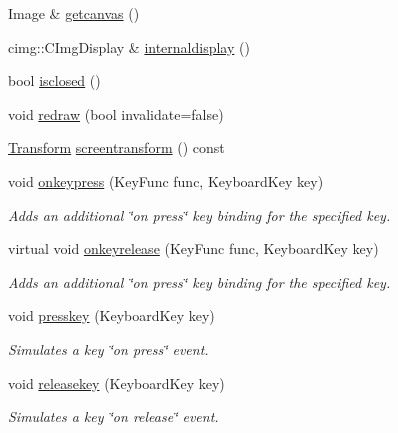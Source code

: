 \begin{DoxyCompactItemize}
\item 
Image \& \hyperlink{classcturtle_1_1InteractiveTurtleScreen_ad2156553b1af3d0ab4527d8ddbda5d61}{getcanvas} ()
\item 
cimg\+::\+C\+Img\+Display \& \hyperlink{classcturtle_1_1InteractiveTurtleScreen_a0ea57bab0cb93f0fa4629747bddbab30}{internaldisplay} ()
\item 
bool \hyperlink{classcturtle_1_1InteractiveTurtleScreen_ab1809a5a10cb3afaa330d6ba2ee5bb49}{isclosed} ()
\item 
void \hyperlink{classcturtle_1_1InteractiveTurtleScreen_ad0e307da3f48e9e1ce6660c975ca3854}{redraw} (bool invalidate=false)
\item 
\hyperlink{classcturtle_1_1Transform}{Transform} \hyperlink{classcturtle_1_1InteractiveTurtleScreen_a6c81f204488e1ebe8180504990e559dc}{screentransform} () const
\item 
void \hyperlink{classcturtle_1_1InteractiveTurtleScreen_a997c82f379c6c90e2f1d2336db8bc1fc}{onkeypress} (Key\+Func func, Keyboard\+Key key)
\begin{DoxyCompactList}\small\item\em Adds an additional \char`\"{}on press\char`\"{} key binding for the specified key. \end{DoxyCompactList}\item 
virtual void \hyperlink{classcturtle_1_1InteractiveTurtleScreen_a313943b2ae07b9a67ae0681fbadc2085}{onkeyrelease} (Key\+Func func, Keyboard\+Key key)
\begin{DoxyCompactList}\small\item\em Adds an additional \char`\"{}on press\char`\"{} key binding for the specified key. \end{DoxyCompactList}\item 
void \hyperlink{classcturtle_1_1InteractiveTurtleScreen_a4273782c35444bc35afb0a8ea0f6a168}{presskey} (Keyboard\+Key key)
\begin{DoxyCompactList}\small\item\em Simulates a key \char`\"{}on press\char`\"{} event. \end{DoxyCompactList}\item 
void \hyperlink{classcturtle_1_1InteractiveTurtleScreen_a31a3f4a793acd97e8e6e8a42a7c7c885}{releasekey} (Keyboard\+Key key)
\begin{DoxyCompactList}\small\item\em Simulates a key \char`\"{}on release\char`\"{} event. \end{DoxyCompactList}\item 

\end{DoxyCompactItemize}
